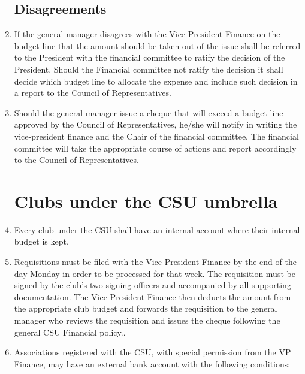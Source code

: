 \documentclass[oneside]{book}
\begin{document}
\begin{enumerate}
\section{\label{Disagreements}Disagreements }
\item If the general manager disagrees with the Vice-President Finance on
the budget line that the amount should be taken out of the issue shall
be referred to the President with the financial committee to ratify
the decision of the President. Should the Financial committee not
ratify the decision it shall decide which budget line to allocate
the expense and include such decision in a report to the Council of
Representatives. 
\item Should the general manager issue a cheque that will exceed a budget
line approved by the Council of Representatives, he/she will notify
in writing the vice-president finance and the Chair of the financial
committee. The financial committee will take the appropriate course
of actions and report accordingly to the Council of Representatives. 

\chapter{\label{Clubs_under_the_CSU_umbrella}Clubs under the CSU umbrella }
\item Every club under the CSU shall have an internal account where their
internal budget is kept. 
\item Requisitions must be filed with the Vice-President Finance by the
end of the day Monday in order to be processed for that week. The
requisition must be signed by the club's two signing officers and
accompanied by all supporting documentation. The Vice-President Finance
then deducts the amount from the appropriate club budget and forwards
the requisition to the general manager who reviews the requisition
and issues the cheque following the general CSU Financial policy.. 
\item Associations registered with the CSU, with special permission from
the VP Finance, may have an external bank account with the following
conditions: 


\end{enumerate}
\end{document}
